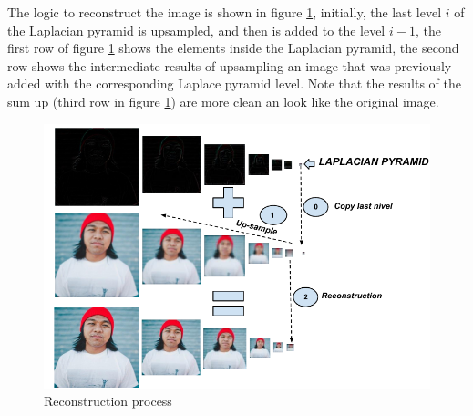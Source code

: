 The logic to reconstruct the image is shown in figure \ref{fig:reconstruction-laplace}, initially, the last level $i$ of the Laplacian pyramid is upsampled, and then is added to the level $i-1$, the first row of figure \ref{fig:reconstruction-laplace} shows the elements inside the Laplacian pyramid, the second row shows the intermediate results of upsampling an image that was previously added with the corresponding Laplace pyramid level. Note that the results of the sum up (third row in figure \ref{fig:reconstruction-laplace}) are more clean an look like the original image.

\begin{figure}[h!]
\hspace{-1cm}
  \includegraphics[width=1.1\linewidth]{output/reconstructionImage.pdf}
  \caption{Reconstruction process}
\label{fig:reconstruction-laplace}
\end{figure}
